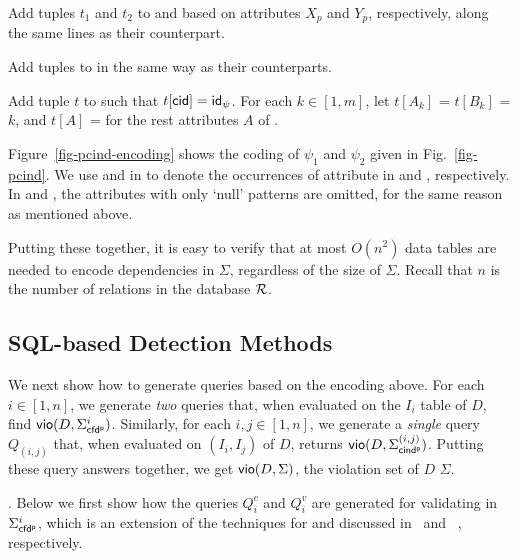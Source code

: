 \vspace{-0.5ex}\bi
\item[(1)] Add tuples $t_1$ and $t_2$ to  and 
based on attributes $X_p$ and $Y_p$, respectively, along the
same lines as their \pCFD counterpart.
\item[(2)] Add tuples to \Enc{\ne} in the same way as their
\pCFD counterparts.
\item[(3)] Add tuple $t$ to \Enc{} such that $t[\protect\mathsf{cid}] = {\mathsf{id}}_\psi$.
For each $k\in[1, m]$,  let $t[A_k]$ = $t[B_k]$ = $k$, and $t[A]$ =
 for the rest attributes $A$ of \Enc{}. \ei \vspace{-1ex}




\begin{example} \label{exa-enc-pfind}
Figure~\ref{fig-pcind-encoding} shows the coding of \pCINDs $\psi_1$
and $\psi_2$ given in Fig.~\ref{fig-pcind}. We use  and
 in \Enc{} to denote the occurrences of attribute
 in  and , respectively. In
 and , the attributes with only `null' patterns are
omitted, for the same reason as \pCFDs mentioned above.
\end{example}

Putting these together, it is easy to verify that at most $O(n^2)$
data tables are needed to encode dependencies in $\Sigma$,
regardless of the size of $\Sigma$. Recall that $n$ is the number of
relations in the database $\R$.


\subsection{SQL-based Detection Methods}

We next show how to generate \SQL queries based on the encoding
above. For each $i\in [1, n]$, we generate {\em two} \SQL queries
that, when evaluated on the $I_i$ table of $D$, find ${\mathsf{vio}}(D,
\Sigma_{{\mathsf{cfd^p}}}^i)$. Similarly, for each $i,j \in [1, n]$, we generate a {\em
single} \SQL query $Q_{(i,j)}$ that, when evaluated on $(I_i, I_j)$
of $D$, returns ${\mathsf{vio}}(D, \Sigma_{{\mathsf{cind^p}}}^{(i,j)})$. Putting these query
answers together, we get ${\mathsf{vio}}(D, \Sigma)$, the violation set of
$D$ \wrt $\Sigma$.

.
Below we first show how the \SQL queries $Q_{i}^c$ and $Q_{i}^v$ are generated for
validating \pCFDs in $\Sigma_{{\mathsf{cfd^p}}}^i$, which is an extension of the
\SQL techniques for \CFDs and \eCFDs discussed in~\cite{CFDs} and ~\cite{icde08}, respectively.

